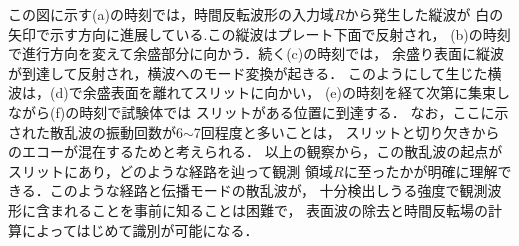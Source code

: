 この図に示す(a)の時刻では，時間反転波形の入力域$R$から発生した縦波が
白の矢印で示す方向に進展している.この縦波はプレート下面で反射され，
(b)の時刻で進行方向を変えて余盛部分に向かう．続く(c)の時刻では，
余盛り表面に縦波が到達して反射され，横波へのモード変換が起きる．
このようにして生じた横波は，(d)で余盛表面を離れてスリットに向かい，
(e)の時刻を経て次第に集束しながら(f)の時刻で試験体では
スリットがある位置に到達する．
%
なお，ここに示された散乱波の振動回数が6$\sim$7回程度と多いことは，
スリットと切り欠きからのエコーが混在するためと考えられる．
%
以上の観察から，この散乱波の起点がスリットにあり，どのような経路を辿って観測
領域$R$に至ったかが明確に理解できる．このような経路と伝播モードの散乱波が，
十分検出しうる強度で観測波形に含まれることを事前に知ることは困難で，
表面波の除去と時間反転場の計算によってはじめて識別が可能になる．
